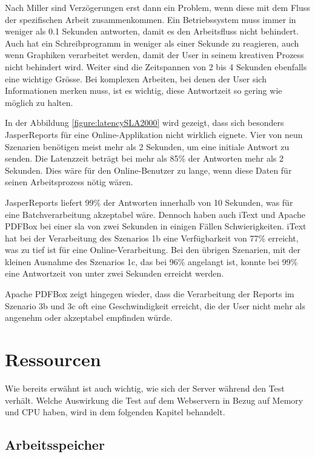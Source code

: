 \documentclass[main.tex]{subfiles}
\begin{document}
Nach Miller \cite[Seite~270]{miller_1968} sind Verzögerungen erst dann ein Problem, wenn diese mit dem Fluss der spezifischen Arbeit zusammenkommen. Ein Betriebssystem muss immer in weniger als 0.1 Sekunden antworten, damit es den Arbeitsfluss nicht behindert. Auch hat ein Schreibprogramm in weniger als einer Sekunde zu reagieren, auch wenn Graphiken verarbeitet werden, damit der User in seinem kreativen Prozess nicht behindert wird. Weiter sind die Zeitspannen von 2 bis 4 Sekunden ebenfalls eine wichtige Grösse. Bei komplexen Arbeiten, bei denen der User sich Informationen merken muss, ist es wichtig, diese Antwortzeit so gering wie möglich zu halten.

In der Abbildung \ref{figure:latencySLA2000} wird gezeigt, dass sich besonders JasperReports für eine Online-Applikation nicht wirklich eignete. Vier von neun Szenarien benötigen meist mehr als 2 Sekunden, um eine initiale Antwort zu senden. Die Latenzzeit beträgt bei mehr als 85\% der Antworten mehr als 2 Sekunden. Dies wäre für den Online-Benutzer zu lange, wenn diese Daten für seinen Arbeitsprozess nötig wären.

JasperReports liefert 99\% der Antworten innerhalb von 10 Sekunden, was für eine Batchverarbeitung akzeptabel wäre. Dennoch haben auch iText und Apache PDFBox bei einer \acrshort{sla} von zwei Sekunden in einigen Fällen Schwierigkeiten. iText hat bei der Verarbeitung des Szenarios 1b eine Verfügbarkeit von 77\% erreicht, was zu tief ist für eine Online-Verarbeitung. Bei den übrigen Szenarien, mit der kleinen Ausnahme des Szenarios 1c, das bei 96\% angelangt ist, konnte bei 99\% eine Antwortzeit von unter zwei Sekunden erreicht werden.

Apache PDFBox zeigt hingegen wieder, dass die Verarbeitung der Reports im Szenario 3b und 3c oft eine Geschwindigkeit erreicht, die der User nicht mehr als angenehm oder akzeptabel empfinden würde.








\section{Ressourcen}
Wie bereits erwähnt ist auch wichtig, wie sich der Server während den Test verhält.
Welche Auswirkung die Test auf dem Webservern in Bezug auf Memory und CPU haben, wird in dem folgenden Kapitel behandelt. 

\subsection{Arbeitsspeicher}
\end{document}
